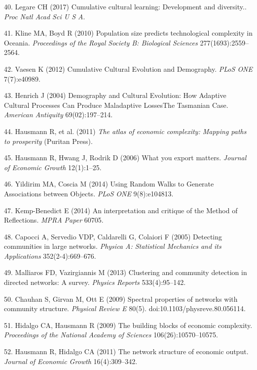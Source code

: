 \documentclass{pnastwo}
\begin{document}
\begin{article}
\label{csl:40}40. Legare CH (2017) {Cumulative cultural learning: Development and diversity.}. \textit{Proc Natl Acad Sci U S A}.

\label{csl:41}41. Kline MA, Boyd R (2010) {Population size predicts technological complexity in Oceania}. \textit{Proceedings of the Royal Society B: Biological Sciences} 277(1693):2559–2564.

\label{csl:42}42. Vaesen K (2012) {Cumulative Cultural Evolution and Demography}. \textit{{PLoS} {ONE}} 7(7):e40989.

\label{csl:43}43. Henrich J (2004) {Demography and Cultural Evolution: How Adaptive Cultural Processes Can Produce Maladaptive Losses{\textemdash}The Tasmanian Case}. \textit{American Antiquity} 69(02):197–214.

\label{csl:44}44. Hausmann R, et al. (2011) \textit{{The atlas of economic complexity: Mapping paths to prosperity}} (Puritan Press).

\label{csl:45}45. Hausmann R, Hwang J, Rodrik D (2006) {What you export matters}. \textit{Journal of Economic Growth} 12(1):1–25.

\label{csl:46}46. Yildirim MA, Coscia M (2014) {Using Random Walks to Generate Associations between Objects}. \textit{{PLoS} {ONE}} 9(8):e104813.

\label{csl:47}47. Kemp-Benedict E (2014) {An interpretation and critique of the Method of Reflections}. \textit{MPRA Paper} 60705.

\label{csl:48}48. Capocci A, Servedio VDP, Caldarelli G, Colaiori F (2005) {Detecting communities in large networks}. \textit{Physica A: Statistical Mechanics and its Applications} 352(2-4):669–676.

\label{csl:49}49. Malliaros FD, Vazirgiannis M (2013) {Clustering and community detection in directed networks: A survey}. \textit{Physics Reports} 533(4):95–142.

\label{csl:50}50. Chauhan S, Girvan M, Ott E (2009) {Spectral properties of networks with community structure}. \textit{Physical Review E} 80(5). doi:10.1103/physreve.80.056114.

\label{csl:51}51. Hidalgo CA, Hausmann R (2009) {The building blocks of economic complexity}. \textit{Proceedings of the National Academy of Sciences} 106(26):10570–10575.

\label{csl:52}52. Hausmann R, Hidalgo CA (2011) {The network structure of economic output}. \textit{Journal of Economic Growth} 16(4):309–342.


\end{article}
\end{document}
